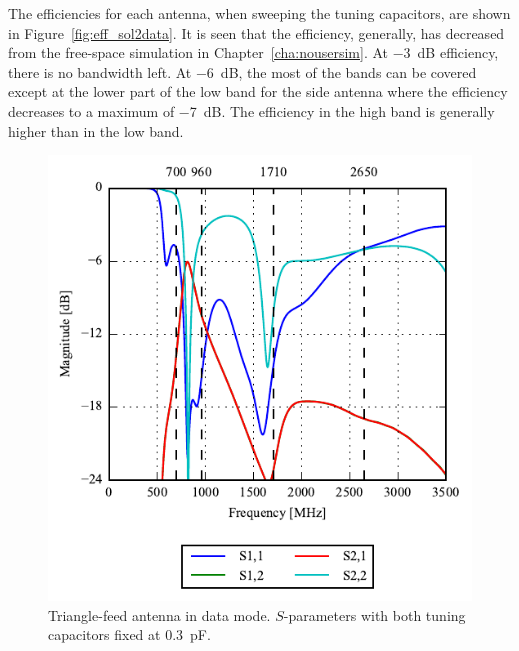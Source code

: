 The efficiencies for each antenna, when sweeping the tuning capacitors, are shown in Figure~\ref{fig:eff_sol2data}. It is seen that the efficiency, generally, has decreased from the free-space simulation in Chapter~\ref{cha:nousersim}. At  \SI{-3}{dB} efficiency, there is no bandwidth left. At \SI{-6}{dB}, the most of the bands can be covered except at the lower part of the low band for the side antenna where the efficiency decreases to a maximum of \SI{-7}{dB}. The efficiency in the high band is generally higher than in the low band.

\begin{figure}[htbp]
    \centering
    \includegraphics{img/tech_sol/trianglefeed/data_mode/sparams.pdf}
    \caption{Triangle-feed antenna in data mode. $S$-parameters with both tuning capacitors fixed at \SI{0.3}{pF}.}
    \label{fig:triang_sparam_data}
\end{figure}

